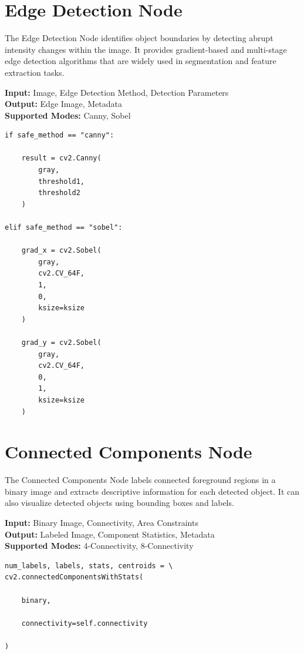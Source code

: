 \documentclass[a4paper,12pt]{report}
\begin{document}
\section{Edge Detection Node}
\label{sec:edge-detection-node}

The Edge Detection Node identifies object boundaries by detecting abrupt
intensity changes within the image. It provides gradient-based and
multi-stage edge detection algorithms that are widely used in segmentation
and feature extraction tasks.

\noindent \textbf{Input:} Image, Edge Detection Method, Detection Parameters \\
\textbf{Output:} Edge Image, Metadata \\
\textbf{Supported Modes:} Canny, Sobel

\begin{lstlisting}[caption={Core Algorithm}, label={lst:edge-detection-node}]
if safe_method == "canny":

    result = cv2.Canny(
        gray,
        threshold1,
        threshold2
    )

elif safe_method == "sobel":

    grad_x = cv2.Sobel(
        gray,
        cv2.CV_64F,
        1,
        0,
        ksize=ksize
    )

    grad_y = cv2.Sobel(
        gray,
        cv2.CV_64F,
        0,
        1,
        ksize=ksize
    )
\end{lstlisting}

\section{Connected Components Node}
\label{sec:connected-components-node}

The Connected Components Node labels connected foreground regions in a
binary image and extracts descriptive information for each detected
object. It can also visualize detected objects using bounding boxes and
labels.

\noindent \textbf{Input:} Binary Image, Connectivity, Area Constraints \\
\textbf{Output:} Labeled Image, Component Statistics, Metadata \\
\textbf{Supported Modes:} 4-Connectivity, 8-Connectivity

\begin{lstlisting}[caption={Core Algorithm}, label={lst:connected-components-node}]
num_labels, labels, stats, centroids = \
cv2.connectedComponentsWithStats(

    binary,

    connectivity=self.connectivity

)
\end{lstlisting}
\end{document}
